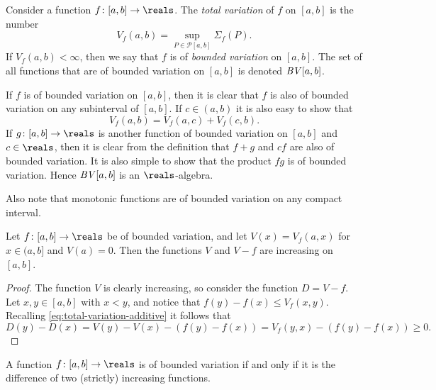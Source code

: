 \documentclass[article, a4paper, 11pt, oneside]{memoir}
\numberwithin{equation}{chapter}
\newcommand{\calP}{\mathcal{P}}
\begin{document}
\begin{definition}
    Consider a function $f \colon [a,b] \to \reals$. The \emph{total variation} of $f$ on $[a,b]$ is the number
    \begin{equation*}
        V_f(a,b)
            = \sup_{P \in \calP[a,b]} \Sigma_f(P).
    \end{equation*}
    If $V_f(a,b) < \infty$, then we say that $f$ is of \emph{bounded variation} on $[a,b]$. The set of all functions that are of bounded variation on $[a,b]$ is denoted $\mathit{BV}[a,b]$.
\end{definition}
%
If $f$ is of bounded variation on $[a,b]$, then it is clear that $f$ is also of bounded variation on any subinterval of $[a,b]$. If $c \in (a,b)$ it is also easy to show that
%
\begin{equation}
    \label{eq:total-variation-additive}
    V_f(a,b)
        = V_f(a,c) + V_f(c,b).
\end{equation}
%
If $g \colon [a,b] \to \reals$ is another function of bounded variation on $[a,b]$ and $c \in \reals$, then it is clear from the definition that $f + g$ and $cf$ are also of bounded variation. It is also simple to show that the product $fg$ is of bounded variation. Hence $\mathit{BV}[a,b]$ is an $\reals$-algebra.

Also note that monotonic functions are of bounded variation on any compact interval.

\begin{lemma}
    \label{lem:total-variation-increasing}
    Let $f \colon [a,b] \to \reals$ be of bounded variation, and let $V(x) = V_f(a,x)$ for $x \in (a, b]$ and $V(a) = 0$. Then the functions $V$ and $V - f$ are increasing on $[a,b]$.
\end{lemma}

\begin{proof}
    The function $V$ is clearly increasing, so consider the function $D = V-f$. Let $x,y \in [a,b]$ with $x < y$, and notice that $f(y) - f(x) \leq V_f(x,y)$. Recalling \cref{eq:total-variation-additive} it follows that
    \begin{equation*}
        D(y) - D(x)
            = V(y) - V(x) - (f(y) - f(x))
            = V_f(y,x) - (f(y) - f(x))
            \geq 0.
    \end{equation*}
\end{proof}


\begin{proposition}
    \label{prop:BV-difference-of-increasing-functions}
    A function $f \colon [a,b] \to \reals$ is of bounded variation if and only if it is the difference of two (strictly) increasing functions.
\end{proposition}
\end{document}
